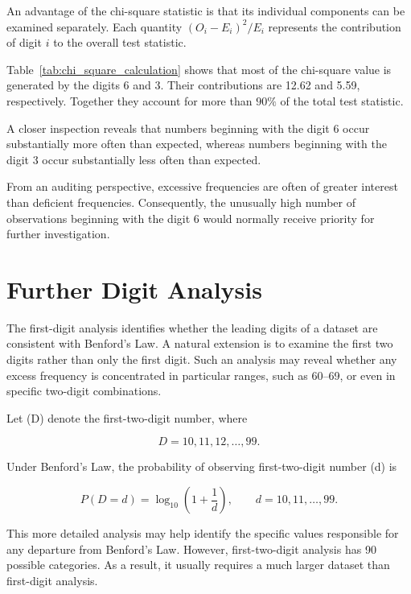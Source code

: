 An advantage of the chi-square statistic is that its individual components can be examined separately. Each quantity $(O_i-E_i)^2/E_i$ represents the contribution of digit \(i\) to the overall test statistic.

\medskip
Table~\ref{tab:chi_square_calculation} shows that most of the chi-square value is generated by the digits 6 and 3. 
Their contributions are 12.62 and 5.59, respectively. 
Together they account for more than \(90\%\) of the total test statistic.

A closer inspection reveals that numbers beginning with the digit 6 occur substantially more often than expected, whereas numbers beginning with the digit 3 occur substantially less often than expected.

From an auditing perspective, excessive frequencies are often of greater interest than deficient frequencies. Consequently, the unusually high number of observations beginning with the digit 6 would normally receive priority for further investigation.

\section{Further Digit Analysis}
\label{sec:further_digit_analysis}

The first-digit analysis identifies whether the leading digits of a dataset are consistent with Benford's Law. A natural extension is to examine the first two digits rather than only the first digit. Such an analysis may reveal whether any excess frequency is concentrated in particular ranges, such as 60--69, or even in specific two-digit combinations.

Let (D) denote the first-two-digit number, where

\begin{equation*}
D = 10,11,12,\ldots,99.
\end{equation*}

Under Benford's Law, the probability of observing first-two-digit number (d) is

\begin{equation}
P(D=d)
=
\log_{10}
\left(
1+\frac{1}{d}
\right),
\qquad d=10,11,\ldots,99.
\end{equation}

This more detailed analysis may help identify the specific values responsible for any departure from Benford's Law. However, first-two-digit analysis has 90 possible categories. As a result, it usually requires a much larger dataset than first-digit analysis.

